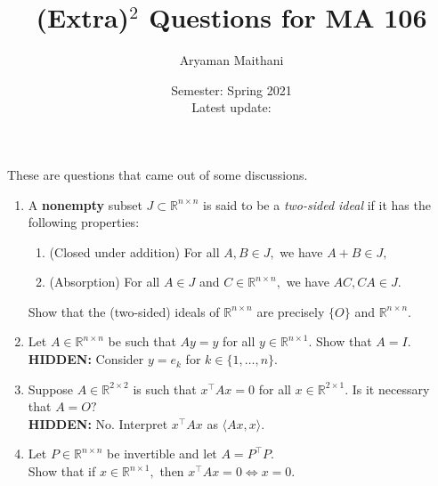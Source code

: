 \documentclass[12pt]{article}
\title{(Extra)\texorpdfstring{$^2$}{2} Questions for MA 106}
\author{Aryaman Maithani}%
\date{Semester: Spring 2021\\ Latest update: \DTMnow}
\newcommand{\hint}[1]{\textbf{HIDDEN:} {\color[rgb]{0.95, 0.95, 0.95}#1}}
\begin{document}
\maketitle

These are questions that came out of some discussions.

\begin{enumerate}
	\item A \textbf{nonempty} subset $J \subset \mathbb{R}^{n \times n}$ is said to be a \emph{two-sided ideal} if it has the following properties:
	\begin{enumerate}
		\item (Closed under addition) For all $A, B \in J,$ we have $A + B \in J,$
		\item (Absorption) For all $A \in J$ and $C \in \mathbb{R}^{n \times n},$ we have $AC, CA \in J.$
	\end{enumerate}
	Show that the (two-sided) ideals of $\mathbb{R}^{n \times n}$ are precisely $\{O\}$ and $\mathbb{R}^{n \times n}.$
	\item Let $A \in \mathbb{R}^{n \times n}$ be such that $Ay = y$ for all $y \in \mathbb{R}^{n \times 1}.$ Show that $A = I.$\\
	\hint{Consider $y = e_k$ for $k \in \{1, \ldots, n\}.$}
	\item Suppose $A \in \mathbb{R}^{2 \times 2}$ is such that $x^\top Ax = 0$ for all $x \in \mathbb{R}^{2 \times 1}.$ Is it necessary that $A = O?$\\
	\hint{No. Interpret $x^\top Ax$ as $\langle Ax, x\rangle.$}
	\item Let $P \in \mathbb{R}^{n \times n}$ be invertible and let $A = P^{\top}P.$ \\
	Show that if $x \in \mathbb{R}^{n \times 1},$ then $x^\top Ax = 0 \iff x = 0.$
\end{enumerate}
\end{document}
